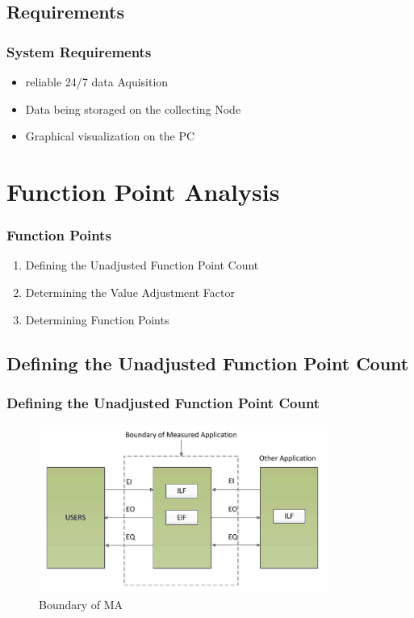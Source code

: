 \documentclass{beamer}
\begin{document}
\subsection{Requirements}
\frame
{
	\frametitle{System Requirements}
	\begin{itemize}
	\item reliable 24/7 data Aquisition
	\item Data being storaged on the collecting Node
	\item Graphical visualization on the PC
	\end{itemize}
}

\section{Function Point Analysis}
\frame
{
	\frametitle{Function Points}
	\begin{enumerate}
	\item Defining the Unadjusted Function Point Count
	\item Determining the Value Adjustment Factor
	\item Determining Function Points
	\end{enumerate}
}

\subsection{Defining the Unadjusted Function Point Count}
\frame
{
	\frametitle{Defining the Unadjusted Function Point Count}
	\begin{figure}[h!]
  		\centering
    	\includegraphics[width=0.85\textwidth]{../Images/FP_model.png}
		\caption{Boundary of MA}
	\end{figure}
}
\end{document}
